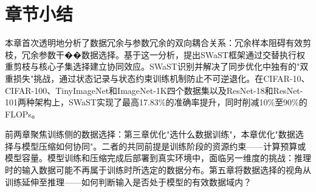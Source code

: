 \section{章节小结}

本章首次透明地分析了数据冗余与参数冗余的双向耦合关系：冗余样本阻碍有效剪枝，冗余参数干��数据选择。基于这一分析，提出SWaST框架通过交替执行权重剪枝与核心子集选择建立协同效应。SWaST识别并解决了同步优化中独有的"双重损失"挑战，通过状态记录与状态约束训练机制防止不可逆退化。在CIFAR-10、CIFAR-100、TinyImageNet和ImageNet-1K四个数据集以及ResNet-18和ResNet-101两种架构上，SWaST实现了最高17.83\%的准确率提升，同时削减10\%至90\%的FLOPs。%

前两章聚焦训练侧的数据选择：第三章优化"选什么数据训练"，本章优化"数据选择与模型压缩如何协同"。二者的共同前提是训练阶段的资源约束——计算预算或模型容量。模型训练和压缩完成后部署到真实环境中，面临另一维度的挑战：推理时的输入数据可能不再属于训练时所选定的数据分布。第五章将数据选择的视角从训练延伸至推理——如何判断输入是否处于模型的有效数据域内？
